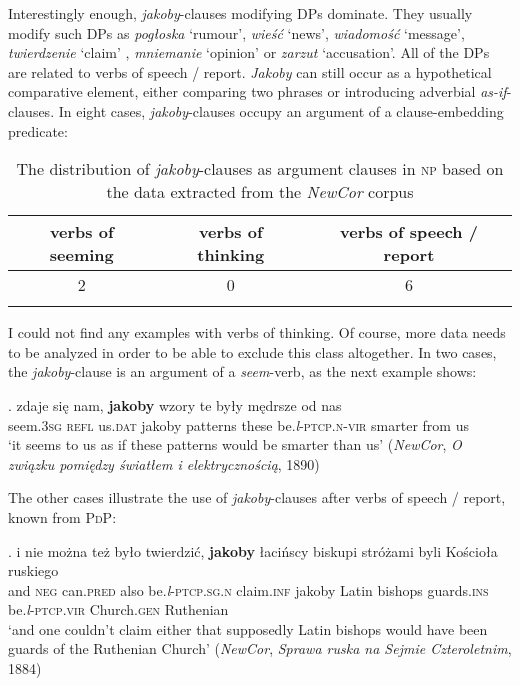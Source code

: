 \documentclass[output=paper
,modfonts
,nonflat]{langsci/langscibook}
\newcommand{\glossformat}[1]{\textsc{#1}}
\newcommand{\thirdperson}{\glossformat{3}\xspace}
\newcommand{\dat}{\glossformat{dat}\xspace}
\newcommand{\gen}{\glossformat{gen}\xspace}
\newcommand{\infv}{\glossformat{inf}\xspace}
\newcommand{\ins}{\glossformat{ins}\xspace}
\newcommand{\negation}{\glossformat{neg}\xspace}
\newcommand{\lptcp}{\emph{l}\glossformat{-ptcp}\xspace}
\newcommand{\n}{\glossformat{n}\xspace}
\newcommand{\nvir}{\glossformat{n-vir}\xspace}
\newcommand{\pred}{\glossformat{pred}\xspace}
\newcommand{\refl}{\glossformat{refl}\xspace}
\newcommand{\sg}{\glossformat{sg}\xspace}
\newcommand{\vir}{\glossformat{vir}\xspace}
\newcommand{\nquelle}[1]{\newline\phantom{x}\hfill(#1)}
\begin{document}
\noindent  Interestingly enough, \emph{jakoby}-clauses modifying DPs dominate. They usually modify such DPs as \emph{pogłoska} `rumour', \emph{wieść} `news', \emph{wiadomość} `message', \emph{twierdzenie} `claim' , \emph{mniemanie} `opinion' or \emph{zarzut} `accusation'. All of the DPs are related to verbs of speech / report. \emph{Jakoby} can still occur as a hypothetical comparative element, either comparing two phrases or introducing adverbial \emph{as-if}-clauses. In eight cases, \emph{jakoby}-clauses occupy an argument of a clause-embedding predicate:       

 \begin{table}[h] \center \begin{tabular}{ccc} 
\lsptoprule
verbs of seeming & verbs of thinking & verbs of speech / report \\
\midrule
2 & 0 & 6  \\
\lspbottomrule
\end{tabular}
\caption{The distribution of \emph{jakoby}-clauses as argument clauses in \textsc{np} based on the data extracted from the \emph{NewCor} corpus} \label{staropolski_nowopolski_argument}
\end{table}

\noindent  I could not find any examples with verbs of thinking. Of course, more data needs to be analyzed in order to be able to exclude this class altogether. In two cases, the \emph{jakoby}-clause is an argument of a \emph{seem}-verb, as the next example shows:

\exg.		zdaje się nam, \textbf{jakoby} wzory te były mędrsze od nas \\
		seem.{\thirdperson}{\sg} {\refl} us.{\dat} jakoby	patterns these be.{\lptcp}.{\nvir} smarter from us \\
		`it seems to us as if these patterns would be smarter than us' \nquelle{\emph{NewCor}, \emph{O związku pomiędzy światłem i elektrycznością}, 1890} 

The other cases illustrate the use of \emph{jakoby}-clauses after verbs of speech / report, known from \textsc{PdP}:

\exg.		i nie można też było twierdzić, \textbf{jakoby} łacińscy biskupi stróżami byli Kościoła ruskiego \\
		and {\negation} can.{\pred} also be.{\lptcp}.{\sg}.{\n} claim.{\infv} jakoby Latin bishops guards.{\ins} be.{\lptcp}.{\vir} Church.{\gen} Ruthenian \\
		`and one couldn't claim either that supposedly Latin bishops would have been guards of the Ruthenian Church' \nquelle{\emph{NewCor}, \emph{Sprawa ruska na Sejmie Czteroletnim}, 1884}
\end{document}
